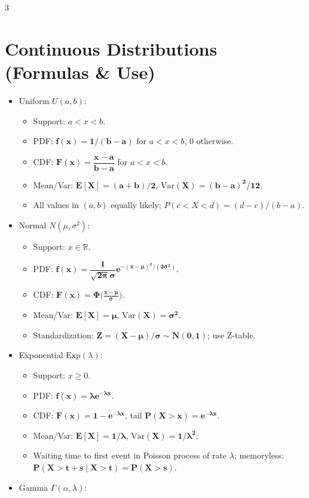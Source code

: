 \documentclass[11pt,landscape]{article}
\begin{document}
\begin{multicols}{3}
\section{Continuous Distributions (Formulas \& Use)}
\begin{itemize}
  \item Uniform $U(a,b)$:
    \begin{itemize}
      \item Support: $a<x<b$.
      \item PDF: $\mathbf{f(x)=1/(b-a)}$ for $a<x<b$, $0$ otherwise.
      \item CDF: $\mathbf{F(x)=\dfrac{x-a}{b-a}}$ for $a<x<b$.
      \item Mean/Var: $\mathbf{E[X]=(a+b)/2}$, $\mathbf{\mathrm{Var}(X)=(b-a)^2/12}$.
      \item All values in $(a,b)$ equally likely; $P(c<X<d)=(d-c)/(b-a)$.
    \end{itemize}
  \item Normal $N(\mu,\sigma^2)$:
    \begin{itemize}
      \item Support: $x\in\mathbb{R}$.
      \item PDF: $\mathbf{f(x)=\dfrac{1}{\sqrt{2\pi}\sigma}e^{-(x-\mu)^2/(2\sigma^2)}}$.
      \item CDF: $\mathbf{F(x)=\Phi\!\big(\tfrac{x-\mu}{\sigma}\big)}$.
      \item Mean/Var: $\mathbf{E[X]=\mu}$, $\mathbf{\mathrm{Var}(X)=\sigma^2}$.
      \item Standardization: $\mathbf{Z=(X-\mu)/\sigma\sim N(0,1)}$; use Z-table.
    \end{itemize}
  \item Exponential $\text{Exp}(\lambda)$:
    \begin{itemize}
      \item Support: $x\ge0$.
      \item PDF: $\mathbf{f(x)=\lambda e^{-\lambda x}}$.
      \item CDF: $\mathbf{F(x)=1-e^{-\lambda x}}$, tail $\mathbf{P(X>x)=e^{-\lambda x}}$.
      \item Mean/Var: $\mathbf{E[X]=1/\lambda}$, $\mathbf{\mathrm{Var}(X)=1/\lambda^2}$.
      \item Waiting time to first event in Poisson process of rate $\lambda$; memoryless: $\mathbf{P(X>t+s\mid X>t)=P(X>s)}$.
    \end{itemize}
  \item Gamma $\Gamma(\alpha,\lambda)$:

\end{itemize}
\end{multicols}
\end{document}
